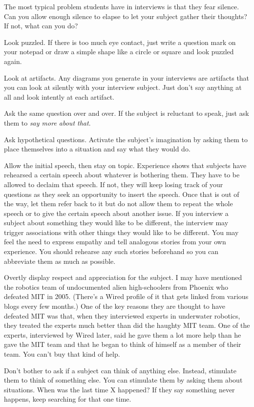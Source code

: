 The most typical problem students have in interviews is that they fear
silence. Can you allow enough silence to elapse to let your subject
gather their thoughts? If not, what can you do?

Look puzzled. If there is too much eye contact, just write a question
mark on your notepad or draw a simple shape like a circle or square and
look puzzled again.

Look at artifacts. Any diagrams you generate in your interviews are
artifacts that you can look at silently with your interview subject.
Just don't say anything at all and look intently at each artifact.

Ask the same question over and over. If the subject is reluctant to
speak, just ask them to \emph{say more about that}.

Ask hypothetical questions. Activate the subject's imagination by asking
them to place themselves into a situation and say what they would do.

Allow the initial speech, then stay on topic. Experience shows that
subjects have rehearsed a certain speech about whatever is bothering
them. They have to be allowed to declaim that speech. If not, they will
keep losing track of your questions as they seek an opportunity to
insert the speech. Once that is out of the way, let them refer back to
it but do not allow them to repeat the whole speech or to give the
certain speech about another issue. If you interview a subject about
something they would like to be different, the interview may trigger
associations with other things they would like to be different. You may
feel the need to express empathy and tell analogous stories from your
own experience. You should rehearse any such stories beforehand so you
can abbreviate them as much as possible.

Overtly display respect and appreciation for the subject. I may have
mentioned the robotics team of undocumented alien high-schoolers from
Phoenix who defeated MIT in 2005. (There's a Wired profile of it that
gets linked from various blogs every few months.) One of the key reasons
they are thought to have defeated MIT was that, when they interviewed
experts in underwater robotics, they treated the experts much better
than did the haughty MIT team. One of the experts, interviewed by Wired
later, said he gave them a lot more help than he gave the MIT team and
that he began to think of himself as a member of their team. You can't
buy that kind of help.

Don't bother to ask if a subject can think of anything else. Instead,
stimulate them to think of something else. You can stimulate them by
asking them about situations. When was the last time X happened? If they
say something never happens, keep searching for that one time.


